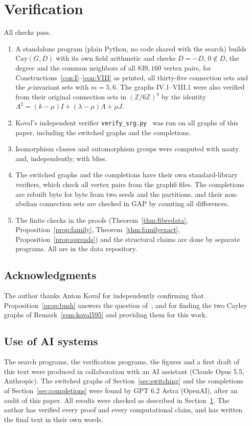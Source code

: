 \documentclass[11pt]{amsart}
\theoremstyle{definition}
\newcommand{\Z}{\mathbb{Z}}
\newcommand{\Cay}{\mathrm{Cay}}
\begin{document}
\section{Verification}\label{sec:verification}
All checks pass.
\begin{enumerate}
\item A standalone program (plain Python, no code shared with the search) builds $\Cay(G,D)$ with its own field arithmetic and checks $D=-D$, $0\notin D$, the degree and the common neighbors of all $839{,}160$ vertex pairs, for Constructions~\ref{con:I}--\ref{con:VIII} as printed, all thirty-five connection sets and the $\rho$-invariant sets with $m=5,6$. The graphs IV.1--VIII.1 were also verified from their original connection sets in $(\Z/6\Z)^4$ by the identity $A^2=(k-\mu)I+(\lambda-\mu)A+\mu J$.
\item Kova\v{l}'s independent verifier \texttt{verify\_srg.py}~\cite{KovalNew} was run on all graphs of this paper, including the switched graphs and the completions.
\item Isomorphism classes and automorphism groups were computed with nauty and, independently, with bliss.
\item The switched graphs and the completions have their own standard-library verifiers, which check all vertex pairs from the graph6 files. The completions are rebuilt byte for byte from two seeds and the partitions, and their non-abelian connection sets are checked in GAP by counting all differences.
\item The finite checks in the proofs (Theorem~\ref{thm:fibredata}, Proposition~\ref{prop:family}, Theorem~\ref{thm:familyexact}, Proposition~\ref{prop:spreads}) and the structural claims are done by separate programs. All are in the data repository.
\end{enumerate}

\subsection*{Acknowledgments}
The author thanks Anton Kova\v{l} for independently confirming that Proposition~\ref{prop:bush} answers the question of~\cite[Section~4.10]{KovalMultiOrbit}, and for finding the two Cayley graphs of Remark~\ref{rem:koval595} and providing them for this work.

\subsection*{Use of AI systems}
The search programs, the verification programs, the figures and a first draft of this text were produced in collaboration with an AI assistant (Claude Opus 5.5, Anthropic). The switched graphs of Section~\ref{sec:switching} and the completions of Section~\ref{sec:completions} were found by GPT 6.2 Astra (OpenAI), after an audit of this paper. All results were checked as described in Section~\ref{sec:verification}. The author has verified every proof and every computational claim, and has written the final text in their own words.
\end{document}
